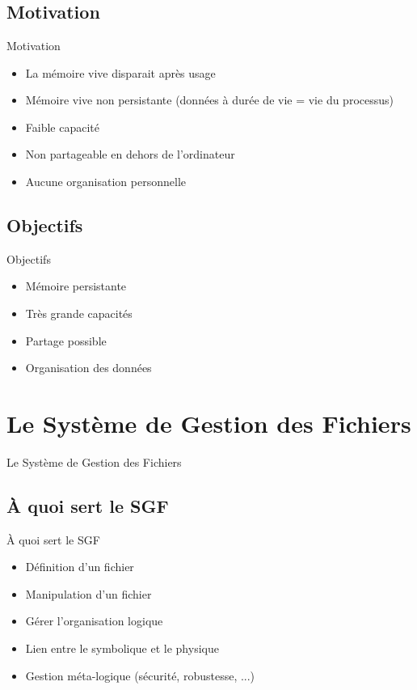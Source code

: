 \section{\sectitle}
\begin{frame}{\sectitle}
\def\subsectitle{Motivation}
\subsection{\subsectitle}
\begin{block}{\subsectitle}
\begin{itemize}
    \item La mémoire vive disparait après usage
    \item Mémoire vive non persistante (données à durée de vie = vie du processus)
    \item Faible capacité
    \item Non partageable en dehors de l'ordinateur
    \item Aucune organisation personnelle
\end{itemize}
\end{block}

\def\subsectitle{Objectifs}
\subsection{\subsectitle}
\begin{block}{\subsectitle}
\begin{itemize}
    \item Mémoire persistante
    \item Très grande capacités
    \item Partage possible
    \item Organisation des données
\end{itemize}
\end{block}

\end{frame}



\def\sectitle{Le Système de Gestion des Fichiers}
\section{\sectitle}
\begin{frame}{\sectitle}
\def\subsectitle{À quoi sert le SGF}
\subsection{\subsectitle}
\begin{block}{\subsectitle}
\begin{itemize}
    \item Définition d'un fichier
    \item Manipulation d'un fichier
    \item Gérer l'organisation logique
    \item Lien entre le symbolique et le physique
    \item Gestion méta-logique (sécurité, robustesse, ...)
\end{itemize}
\end{block}
\end{frame}


